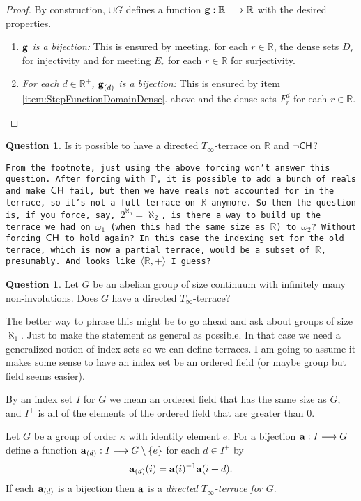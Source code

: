 \documentclass{amsart}
\theoremstyle{definition}
\newtheorem{question}[theorem]{Question}
\theoremstyle{remark}
\renewcommand{\P}{\mathbb{P}}
\newcommand{\R}{\mathbb{R}}
\newcommand{\CH}{\textup{\textsf{CH}}}
\newcommand{\To}{\longrightarrow}
\renewcommand{\a}{\textup{\textbf{a}}}
\newcommand{\g}{\textup{\textbf{g}}}
\begin{document}
\begin{proof}
By construction, $\cup G$ defines a function $\g: \R \To \R$ with the desired properties. \begin{enumerate}
	\item \emph{$\g$ is a bijection:} This is ensured by meeting, for each $r \in \R$, the dense sets $D_r$ for injectivity and for meeting $E_r$ for each $r \in \R$ for surjectivity.
	\item \emph{For each $d \in \R^+$, $\g_{(d)}$ is a bijection:} This is ensured by item \ref{item:StepFunctionDomainDense}. above and the dense sets $F^d_r$ for each $r \in \R$.
\end{enumerate}
\end{proof}
		
\begin{question} Is it possible to have a directed $T_\infty$-terrace on $\R$ and $\neg \CH$? \end{question}
\texttt{From the footnote, just using the above forcing won't answer this question. After forcing with $\P$, it is possible to add a bunch of reals and make $\CH$ fail, but then we have reals not accounted for in the terrace, so it's not a full terrace on $\R$ anymore. So then the question is, if you force, say, $2^{\aleph_0} = \aleph_2$, is there a way to build up the terrace we had on $\omega_1$ (when this had the same size as $\R$) to $\omega_2$? Without forcing $\CH$ to hold again? In this case the indexing set for the old terrace, which is now a partial terrace, would be a subset of $\R$, presumably. And looks like $\langle \R, + \rangle$ I guess?}	

\begin{question} Let $G$ be an abelian group of size continuum with infinitely many non-involutions. Does $G$ have a directed $T_\infty$-terrace? \end{question}
The better way to phrase this might be to go ahead and ask about groups of size $\aleph_1$. Just to make the statement as general as possible. In that case we need a generalized notion of index sets so we can define terraces. I am going to assume it makes some sense to have an index set be an ordered field (or maybe group but field seems easier).

By an index set $I$ for $G$ we mean an ordered field that has the same size as $G$, and $I^+$ is all of the elements of the ordered field that are greater than $0$.

Let $G$ be a group of order $\kappa$ with identity element $e$. For a bijection $\a:I \To G$ define a function $\a_{(d)}: I \To G \setminus \{e\}$ for each $d \in I^+$ by $$\a_{(d)}(i)=\a(i)^{-1}\a(i+d).$$ If each $\a_{(d)}$ is a bijection then $\a$ is a \emph{directed $T_\infty$-terrace for $G$}.
\end{document}
